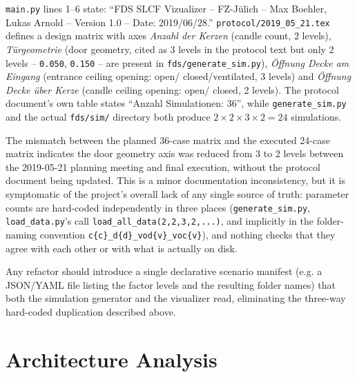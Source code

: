 \documentclass[11pt,a4paper]{report}
\begin{document}
\begin{factbox}
\texttt{main.py} lines 1--6 state: ``FDS SLCF Vizualizer -- FZ-J\"ulich -- Max Boehler, Lukas Arnold
-- Version 1.0 -- Date: 2019/06/28.'' \texttt{protocol/2019\_05\_21.tex} defines a design matrix with
axes \emph{Anzahl der Kerzen} (candle count, 2 levels), \emph{T\"urgeometrie} (door geometry, cited as
3 levels in the protocol text but only 2 levels -- \texttt{0.050}, \texttt{0.150} -- are present in
\texttt{fds/generate\_sim.py}), \emph{\"Offnung Decke am Eingang} (entrance ceiling opening: open/
closed/ventilated, 3 levels) and \emph{\"Offnung Decke \"uber Kerze} (candle ceiling opening: open/
closed, 2 levels). The protocol document's own table states ``Anzahl Simulationen: 36'', while
\texttt{generate\_sim.py} and the actual \texttt{fds/sim/} directory both produce
$2\times2\times3\times2 = 24$ simulations.
\end{factbox}

\begin{interpbox}
The mismatch between the planned 36-case matrix and the executed 24-case matrix indicates the door
geometry axis was reduced from 3 to 2 levels between the 2019-05-21 planning meeting and final
execution, without the protocol document being updated. This is a minor documentation inconsistency,
but it is symptomatic of the project's overall lack of any single source of truth: parameter counts
are hard-coded independently in three places (\texttt{generate\_sim.py}, \texttt{load\_data.py}'s call
\texttt{load\_all\_data(2,2,3,2,...)}, and implicitly in the folder-naming convention
\texttt{c\{c\}\_d\{d\}\_vod\{v\}\_voc\{v\}}), and nothing checks that they agree with each other or
with what is actually on disk.
\end{interpbox}

\begin{recbox}
Any refactor should introduce a single declarative scenario manifest (e.g. a JSON/YAML file listing
the factor levels and the resulting folder names) that both the simulation generator and the
visualizer read, eliminating the three-way hard-coded duplication described above.
\end{recbox}

\chapter{Architecture Analysis}
\end{document}
